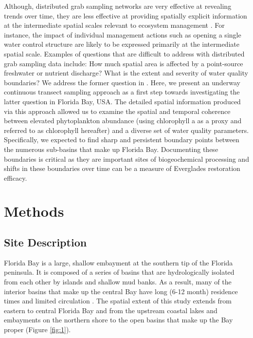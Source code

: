 Although, distributed grab sampling networks are very effective at revealing trends over time, they are less effective at providing spatially explicit information at the intermediate spatial scales relevant to ecosystem management \citep{anttila2008feasible}. For instance, the impact of individual management actions such as opening a single water control structure are likely to be expressed primarily at the intermediate spatial scale. Examples of questions that are difficult to address with distributed grab sampling data include: How much spatial area is affected by a point-source freshwater or nutrient discharge? What is the extent and severity of water quality boundaries? We address the former question in \citet{stachelek_application_2015}. Here, we present an underway continuous transect sampling approach as a first step towards investigating the latter question in Florida Bay, USA. The detailed spatial information produced via this approach allowed us to examine the spatial and temporal coherence between elevated phytoplankton abundance (using chlorophyll a as a proxy and referred to as chlorophyll hereafter) and a diverse set of water quality parameters. Specifically, we expected to find sharp and persistent boundary points between the numerous sub-basins that make up Florida Bay. Documenting these boundaries is critical as they are important sites of biogeochemical processing and shifts in these boundaries over time can be a measure of Everglades restoration efficacy.
\section{Methods}
\label{methods}
\subsection{Site Description}
\label{sitedescription}
Florida Bay is a large, shallow embayment at the southern tip of the Florida peninsula. It is composed of a series of basins that are hydrologically isolated from each other by islands and shallow mud banks. As a result, many of the interior basins that make up the central Bay have long (6-12 month) residence times and limited circulation \citep{lee2016circulation}. The spatial extent of this study extends from eastern to central Florida Bay and from the upstream coastal lakes and embayments on the northern shore to the open basins that make up the Bay proper (Figure \ref{fig:1}). 

